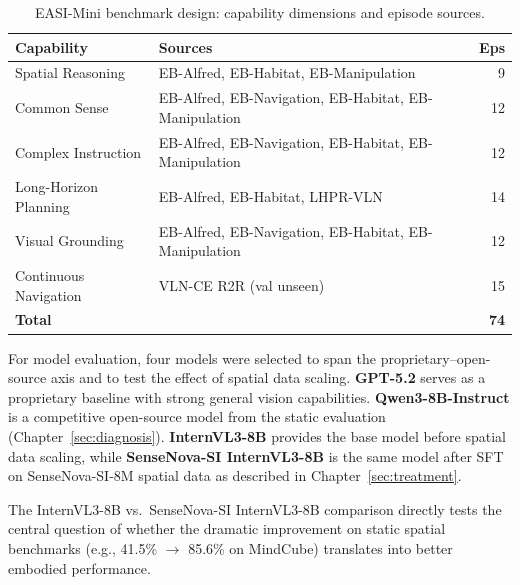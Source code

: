 \begin{table}[htbp]
\centering
\caption{EASI-Mini benchmark design: capability dimensions and episode sources.}
\label{tab:easimini_design}
\renewcommand{\arraystretch}{1.1}
\small
\begin{tabular}{lp{4.5cm}r}
\toprule
\textbf{Capability} & \textbf{Sources} & \textbf{Eps} \\
\midrule
Spatial Reasoning & EB-Alfred, EB-Habitat, EB-Manipulation & 9 \\
Common Sense & EB-Alfred, EB-Navigation, EB-Habitat, EB-Manipulation & 12 \\
Complex Instruction & EB-Alfred, EB-Navigation, EB-Habitat, EB-Manipulation & 12 \\
Long-Horizon Planning & EB-Alfred, EB-Habitat, LHPR-VLN & 14 \\
Visual Grounding & EB-Alfred, EB-Navigation, EB-Habitat, EB-Manipulation & 12 \\
Continuous Navigation & VLN-CE R2R (val unseen) & 15 \\
\midrule
\textbf{Total} & & \textbf{74} \\
\bottomrule
\end{tabular}
\end{table}

For model evaluation, four models were selected to span the proprietary--open-source axis and to test the effect of spatial data scaling. \textbf{GPT-5.2} serves as a proprietary baseline with strong general vision capabilities. \textbf{Qwen3-8B-Instruct} is a competitive open-source model from the static evaluation (Chapter~\ref{sec:diagnosis}). \textbf{InternVL3-8B} provides the base model before spatial data scaling, while \textbf{SenseNova-SI InternVL3-8B} is the same model after SFT on SenseNova-SI-8M spatial data as described in Chapter~\ref{sec:treatment}.

The InternVL3-8B vs.\ SenseNova-SI InternVL3-8B comparison directly tests the central question of whether the dramatic improvement on static spatial benchmarks (e.g., 41.5\% $\to$ 85.6\% on MindCube) translates into better embodied performance.

